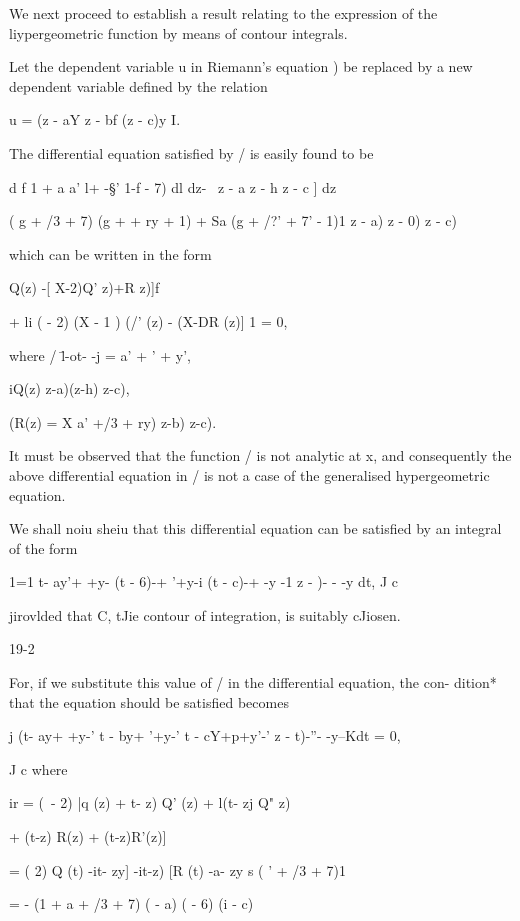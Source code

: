 
We next proceed to establish a result relating to the expression of
the liypergeometric function by means of contour integrals.

Let the dependent variable u in Riemann's equation ) be
replaced by a new dependent variable defined by the relation

u = (z - aY z - bf (z - c)y I.

The differential equation satisfied by / is easily found to be

d f 1 + a a' l+ -§' 1-f - 7) dl dz- \ z - a z - h z - c ] dz

( g + /3 + 7) (g + + ry + 1) + Sa (g + /?' + 7' - 1)1 z - a) z - 0) z
- c)

which can be written in the form

Q(z) -[ X-2)Q' z)+R z)]f

+ li ( - 2) (X - 1 ) (/' (z) - (X-DR (z)] 1 = 0,

where / \=l-ot- -j = a' + ' + y',

iQ(z) z-a)(z-h) z-c),

(R(z) = X a' +/3 + ry) z-b) z-c).

It must be observed that the function / is not analytic at x, and
consequently the above differential equation in / is not a case of the
generalised hypergeometric equation.

We shall noiu sheiu that this differential equation can be satisfied
by an integral of the form

1=1 t- ay'+ +y- (t - 6)-+ '+y-i (t - c)-+ -y -1 z - )- - -y dt, J c

jirovlded that C, tJie contour of integration, is suitably cJiosen.

19-2

%
%

For, if we substitute this value of / in the differential equation,
the con- dition* that the equation should be satisfied becomes

j (t- ay+ +y-' t - by+ '+y-' t - cY+p+y'-' z - t)-''- -y--Kdt = 0,

J c where

ir = (\ - 2) |q (z) + t- z) Q' (z) + l(t- zj Q" z)

+ (t-z) R(z) + (t-z)R'(z)]

= ( 2) Q (t) -it- zy] -it-z) [R (t) -a- zy s ( ' + /3 + 7)1

= - (1 + a + /3 + 7) ( - a) ( - 6) (i - c)

